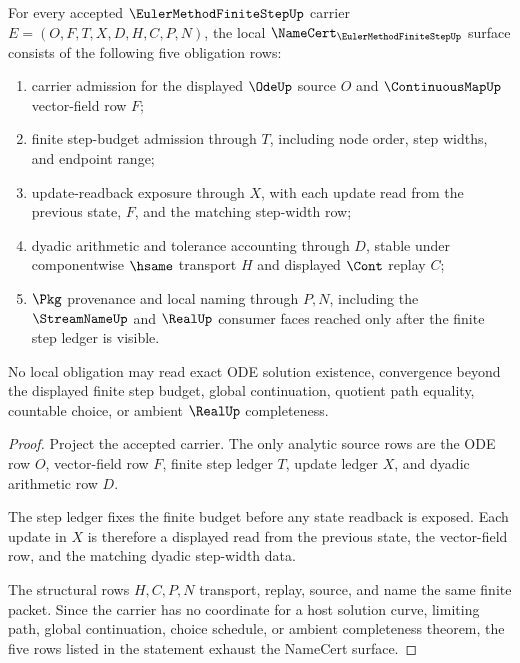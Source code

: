 \begin{theorem}
\label{thm:euler-method-finite-step-namecert-obligations}
For every accepted $\EulerMethodFiniteStepUp$ carrier $E=(O,F,T,X,D,H,C,P,N)$, the local $\NameCert_{\EulerMethodFiniteStepUp}$ surface consists of the following five obligation rows:
\begin{enumerate}
\item carrier admission for the displayed $\OdeUp$ source $O$ and $\ContinuousMapUp$ vector-field row $F$;
\item finite step-budget admission through $T$, including node order, step widths, and endpoint range;
\item update-readback exposure through $X$, with each update read from the previous state, $F$, and the matching step-width row;
\item dyadic arithmetic and tolerance accounting through $D$, stable under componentwise $\hsame$ transport $H$ and displayed $\Cont$ replay $C$;
\item $\Pkg$ provenance and local naming through $P,N$, including the $\StreamNameUp$ and $\RealUp$ consumer faces reached only after the finite step ledger is visible.
\end{enumerate}
No local obligation may read exact ODE solution existence, convergence beyond the displayed finite step budget, global continuation, quotient path equality, countable choice, or ambient $\RealUp$ completeness.
\end{theorem}
\begin{proof}
Project the accepted carrier. The only analytic source rows are the ODE row $O$, vector-field row $F$, finite step ledger $T$, update ledger $X$, and dyadic arithmetic row $D$.

The step ledger fixes the finite budget before any state readback is exposed. Each update in $X$ is therefore a displayed read from the previous state, the vector-field row, and the matching dyadic step-width data.

The structural rows $H,C,P,N$ transport, replay, source, and name the same finite packet. Since the carrier has no coordinate for a host solution curve, limiting path, global continuation, choice schedule, or ambient completeness theorem, the five rows listed in the statement exhaust the NameCert surface.
\end{proof}


